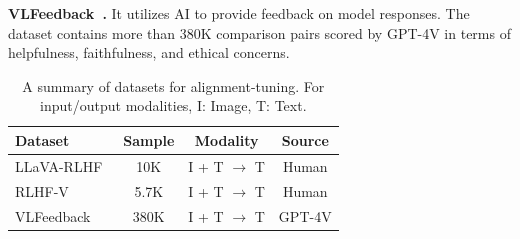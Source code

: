 \noindent \textbf{VLFeedback~\cite{li2023silkie}.}
It utilizes AI to provide feedback on model responses. The dataset contains more than 380K comparison pairs scored by GPT-4V in terms of helpfulness, faithfulness, and ethical concerns. 


\begin{table}[!t]
\centering
\caption{A summary of datasets for alignment-tuning. For input/output modalities, I: Image, T: Text.}
\label{tab:align-tune-data}
\begin{tabular}{lccc}
\toprule
\textbf{Dataset} & \textbf{Sample} & \textbf{Modality}     & \textbf{Source} \\
\midrule
LLaVA-RLHF~\cite{sun2023aligning}       & 10K               & I + T $\rightarrow$ T & Human           \\
RLHF-V~\cite{yu2023rlhf}           & 5.7K              & I + T $\rightarrow$ T & Human           \\
VLFeedback~\cite{li2023silkie}       & 380K              & I + T $\rightarrow$ T & GPT-4V          \\
\bottomrule
\end{tabular}
\end{table}

